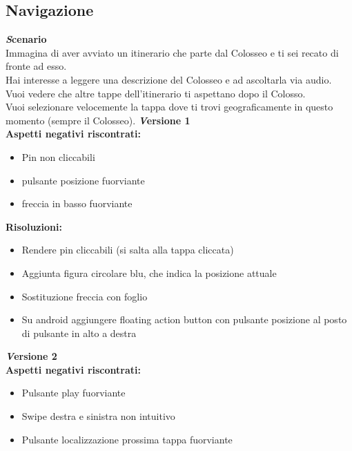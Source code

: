 \subsection{Navigazione}
\textbf{\emph Scenario}\\
Immagina di aver avviato un itinerario che parte dal Colosseo e ti sei recato di fronte
ad esso.\\
Hai interesse a leggere una descrizione del Colosseo e ad ascoltarla via audio.\\
Vuoi vedere che altre tappe dell’itinerario ti aspettano dopo il Colosso.\\
Vuoi selezionare velocemente la tappa dove ti trovi geograficamente in questo momento (sempre il Colosseo).
\newline
\textbf{\emph Versione 1}\\
\textbf{Aspetti negativi riscontrati:}
\begin{itemize}[label=-]

\item Pin non cliccabili
\item pulsante posizione fuorviante
\item freccia in basso fuorviante

\end{itemize}

\textbf{Risoluzioni:}
\begin{itemize}[label=-]

\item Rendere pin cliccabili (si salta alla tappa cliccata)
\item Aggiunta figura circolare blu, che indica la posizione attuale
\item Sostituzione freccia con foglio
\item Su android aggiungere floating action button con pulsante posizione al posto di pulsante in alto a destra

\end{itemize}

\textbf{\emph Versione 2}\\
\textbf{Aspetti negativi riscontrati:}
\begin{itemize}[label=-]

\item Pulsante play fuorviante
\item Swipe destra e sinistra non intuitivo
\item Pulsante localizzazione prossima tappa fuorviante

\end{itemize}

